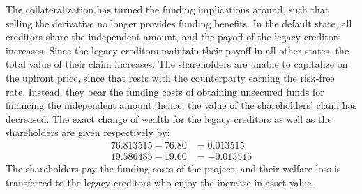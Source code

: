 \documentclass[main.tex]{subfiles}
\begin{document}
        The collateralization has turned the funding implications around,
        such that selling the derivative no longer provides funding benefits.
        In the default state, all creditors share the independent amount,
        and the payoff of the legacy creditors increases. 
        Since the legacy creditors maintain their payoff in all other states,
        the total value of their claim increases.
        The shareholders are unable to capitalize on the upfront price,
        since that rests with the counterparty earning the risk-free rate.
        Instead, they bear the funding costs of obtaining unsecured funds 
        for financing the independent amount;
        hence, the value of the shareholders' claim has decreased.
        The exact change of wealth for the legacy creditors as well as the shareholders 
        are given respectively by:
            \begin{align*}
                \num{76.813515} - \num{76.80} &= \num{0.013515}\\
                \num{19.586485} - \num{19.60} &= \num{-0.013515}
            \end{align*}
        The shareholders pay the funding costs of the project,
        and their welfare loss is transferred to the legacy creditors
        who enjoy the increase in asset value.
\end{document}
